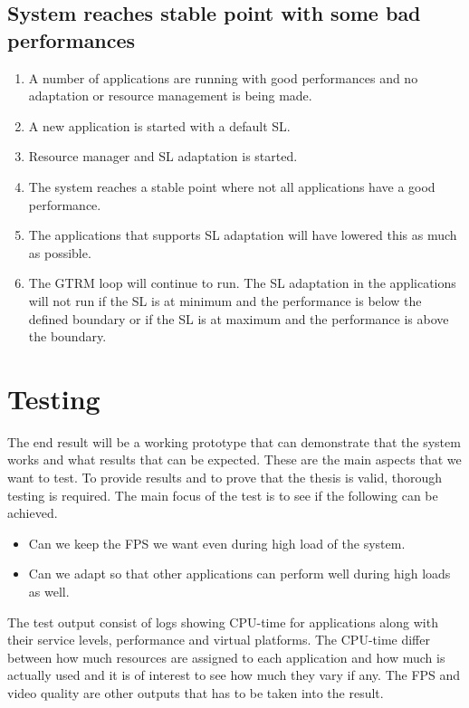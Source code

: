 \documentclass[nobiblatex]{LTHthesis}
\begin{document}
\section{System reaches stable point with some bad performances}
\begin{enumerate}
\item A number of applications are running with good performances and no adaptation or resource management is being made.
\item A new application is started with a default SL.
\item Resource manager and SL adaptation is started.
\item The system reaches a stable point where not all applications have a good performance. 
\item The applications that supports SL adaptation will have lowered this as much as possible.
\item The GTRM loop will continue to run. The SL adaptation in the applications will not run if the SL is at minimum and the performance is below the defined boundary or if the SL is at maximum and the performance is above the boundary.
\end{enumerate}

\chapter{Testing}
\label{chp:test}

The end result will be a working prototype that can demonstrate that the system works and what results that can be expected. These are the main aspects that we want to test.
To provide results and to prove that the thesis is valid, thorough testing is required. The main focus of the test is to see if the following can be achieved.
\begin{itemize}
\item Can we keep the FPS we want even during high load of the system.
\item Can we adapt so that other applications can perform well during high loads as well. 
\end{itemize}

The test output consist of logs showing CPU-time for applications along with their service levels, performance and virtual platforms. The CPU-time differ between how much resources are assigned to each application and how much is actually used and it is of interest to see how much they vary if any. The FPS and video quality are other outputs that has to be taken into the result.
\end{document}
